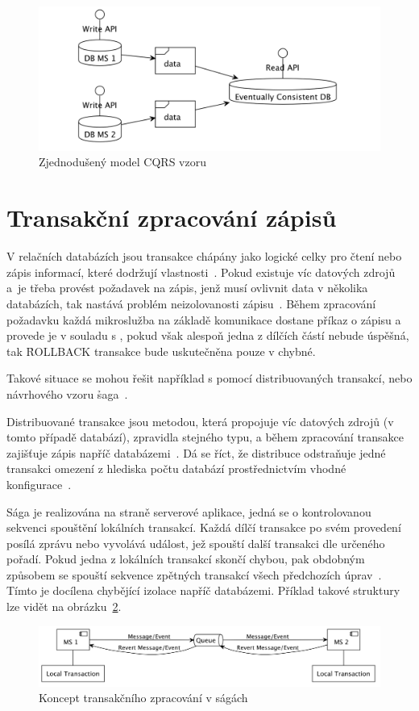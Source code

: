\begin{figure}[htbp]
   \centering
   \includegraphics[max width=\textwidth]{assets/cqrs}
   \caption{Zjednodušený model CQRS vzoru}\label{fig:cqrs}
\end{figure}



\section{Transakční zpracování zápisů}\label{sec:msa-db-transaction}
V relačních databázích jsou transakce chápány jako logické celky pro čtení nebo zápis informací, které dodržují  vlastnosti~\cite{dbtransactions}.
Pokud existuje víc datových zdrojů a~je třeba provést požadavek na zápis, jenž musí ovlivnit data v několika databázích, tak nastává problém neizolovanosti zápisu~\cite{msachris}.
Během zpracování požadavku každá mikroslužba na základě komunikace dostane příkaz o zápisu a provede je v souladu s , pokud však alespoň jedna z dílčích částí nebude úspěšná, tak \h{ROLLBACK} transakce bude uskutečněna pouze v chybné.


Takové situace se mohou řešit například s pomocí distribuovaných transakcí, nebo návrhového vzoru \h{saga}~\cite{msachris}.

Distribuované transakce jsou metodou, která propojuje víc datových zdrojů (v tomto případě databází), zpravidla stejného typu, a během zpracování transakce zajišťuje  zápis napříč databázemi~\cite{distributedtransactions}.
Dá se říct, že distribuce odstraňuje jedné transakci omezení z hlediska počtu databází prostřednictvím vhodné konfigurace~\cite{distributedtransactionsintegration}.

Sága je realizována na straně serverové aplikace, jedná se o kontrolovanou sekvenci spouštění lokálních transakcí.
Každá dílčí transakce po svém provedení posílá zprávu nebo vyvolává událost, jež spouští další transakci dle určeného pořadí.
Pokud jedna z lokálních transakcí skončí chybou, pak obdobným způsobem se spouští sekvence zpětných transakcí všech předchozích úprav~\cite{saga}.
Tímto je docílena chybějící izolace napříč databázemi.
Příklad takové struktury lze vidět na obrázku~\ref{fig:saga}.



\begin{figure}[htbp]
   \centering
   \includegraphics[max width=\textwidth]{assets/saga}
   \caption{Koncept transakčního zpracování v ságách}\label{fig:saga}
\end{figure}
